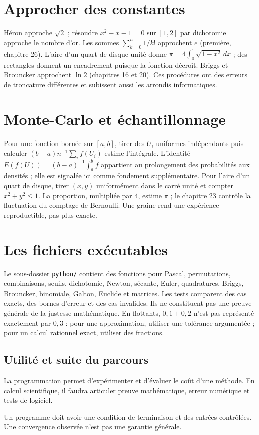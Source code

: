 \documentclass[../cours_tle.tex]{subfiles}
\begin{document}
\section{Approcher des constantes}
Héron approche $\sqrt2$ ; résoudre $x^2-x-1=0$ sur $[1,2]$ par dichotomie approche le nombre d'or. Les sommes $\sum_{k=0}^n1/k!$ approchent $e$ (première, chapitre 26).
L'aire d'un quart de disque unité donne $\pi=4\int_0^1\sqrt{1-x^2}\,dx$ ; des rectangles donnent un encadrement puisque la fonction décroît.
Briggs et Brouncker approchent $\ln2$ (chapitres 16 et 20).
Ces procédures ont des erreurs de troncature différentes et subissent aussi les arrondis informatiques.
\section{Monte-Carlo et échantillonnage}
Pour une fonction bornée sur $[a,b]$, tirer des $U_i$ uniformes indépendants puis calculer
$(b-a)n^{-1}\sum_i f(U_i)$ estime l'intégrale. L'identité $E(f(U))=(b-a)^{-1}\int_a^bf$ appartient au prolongement des probabilités aux densités ; elle est signalée ici comme fondement supplémentaire.
Pour l'aire d'un quart de disque, tirer $(x,y)$ uniformément dans le carré unité et compter $x^2+y^2\le1$. La proportion, multipliée par $4$, estime $\pi$ ; le chapitre 23 contrôle la fluctuation du comptage de Bernoulli.
Une graine rend une expérience reproductible, pas plus exacte.
\section{Les fichiers exécutables}
Le sous-dossier \texttt{python/} contient des fonctions pour Pascal, permutations, combinaisons, seuils, dichotomie, Newton, sécante, Euler, quadratures, Briggs, Brouncker, binomiale, Galton, Euclide et matrices.
Les tests comparent des cas exacts, des bornes d'erreur et des cas invalides. Ils ne constituent pas une preuve générale de la justesse mathématique.
En flottants, $0{,}1+0{,}2$ n'est pas représenté exactement par $0{,}3$ : pour une approximation, utiliser une tolérance argumentée ; pour un calcul rationnel exact, utiliser des fractions.
\begin{finchapitre}
\section{Utilité et suite du parcours}
La programmation permet d'expérimenter et d'évaluer le coût d'une méthode. En calcul scientifique, il faudra articuler preuve mathématique, erreur numérique et tests de logiciel.
\begin{retenir}
Un programme doit avoir une condition de terminaison et des entrées contrôlées. Une convergence observée n'est pas une garantie générale.
\end{retenir}
\end{finchapitre}
\end{document}
